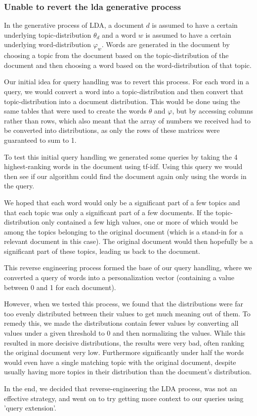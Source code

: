 \subsubsection{Unable to revert the \gls{lda} generative process}
In the generative process of LDA, a document $d$ is assumed to have a certain underlying topic-distribution $\theta_d$ and a word $w$ is assumed to have a certain underlying word-distribution $\varphi_w$.
Words are generated in the document by choosing a topic from the document based on the topic-distribution of the document and then choosing a word based on the word-distribution of that topic.

Our initial idea for query handling was to revert this process.
For each word in a query, we would convert a word into a topic-distribution and then convert that topic-distribution into a document distribution.
This would be done using the same tables that were used to create the words $\theta$ and $\varphi$, but by accessing columns rather than rows, which also meant that the array of numbers we received had to be converted into distributions, as only the rows of these matrices were guaranteed to sum to 1.

To test this initial query handling we generated some queries by taking the 4 highest-ranking words in the document using tf-idf. Using this query we would then see if our algorithm could find the document again only using the words in the query.

We hoped that each word would only be a significant part of a few topics and that each topic was only a significant part of a few documents.
If the topic-distribution only contained a few high values, one or more of which would be among the topics belonging to the original document (which is a stand-in for a relevant document in this case).
The original document would then hopefully be a significant part of these topics, leading us back to the document.

This reverse engineering process formed the base of our query handling, where we converted a query of words into a personalization vector (containing a value between 0 and 1 for each document).

However, when we tested this process, we found that the distributions were far too evenly distributed between their values to get much meaning out of them.
To remedy this, we made the distributions contain fewer values by converting all values under a given threshold to 0 and then normalizing the values.
While this resulted in more decisive distributions, the results were very bad, often ranking the original document very low.
Furthermore significantly under half the words would even have a single matching topic with the original document, despite usually having more topics in their distribution than the document's distribution.
 
In the end, we decided that reverse-engineering the LDA process, was not an effective strategy, and went on to try getting more context to our queries using 'query extension'.

